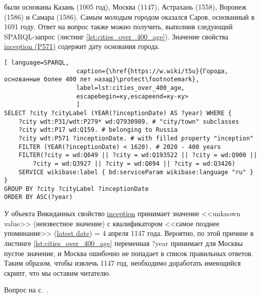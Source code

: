 \begin{task}
    \label{answer:cities_over_400_age}
     были основаны Казань (1005 год), Москва (1147), Астрахань (1558), Воронеж (1586) и Самара (1586). Самым молодым городом оказался Саров, основанный в 1691 году. Ответ на вопрос также можно получить, выполнив следующий SPARQL-запрос (листинг \ref{lst:cities_over_400_age}). Значение свойства \href{https://www.wikidata.org/wiki/Property:P571}{inception (P571)} содержит дату основания города.


    
    \begin{lstlisting}[ language=SPARQL, 
                    caption={\href{https://w.wiki/t5u}{Города, основанные более 400 лет назад}\protect\footnotemark},
                    label=lst:cities_over_400_age, 
                    escapebegin=ку,escapeend=ку-ку>
                    ]
SELECT ?city ?cityLabel (YEAR(?inceptionDate) AS ?year) WHERE {
	?city wdt:P31/wdt:P279* wd:Q7930989. # "city/town" subclasses
	?city wdt:P17 wd:Q159. # belonging to Russia
	?city wdt:P571 ?inceptionDate. # with filled property "inception"  
	FILTER (YEAR(?inceptionDate) < 1620). # 2020 - 400 years
	FILTER(?city = wd:Q649 || ?city = wd:Q193522 || ?city = wd:Q900 ||
		?city = wd:Q3927 || ?city = wd:Q894 || ?city = wd:Q3426)
	SERVICE wikibase:label { bd:serviceParam wikibase:language "ru" }
}
GROUP BY ?city ?cityLabel ?inceptionDate
ORDER BY ASC(?year)
\end{lstlisting}

У объекта Викиданных  свойство \href{https://www.wikidata.org/wiki/Property:P571}{inception} принимает значение <<unknown value>> (неизвестное значение) с квалификатором <<самое позднее упоминание>> (\href{https://www.wikidata.org/wiki/Property:P1326}{latest date}) = 4 апреля 1147 года. Вероятно, по этой причине в листинге \ref{lst:cities_over_400_age} переменная ?year принимает для Москвы пустое значение, и Москва ошибочно не попадает в список правильных ответов. Таким образом, чтобы извлечь 1147 год, необходимо доработать имеющийся скрипт, что мы оставим читателю. 



    \small{Вопрос на с.~\pageref{fig:city_relation_Russia_S_N}.}
\end{task}


